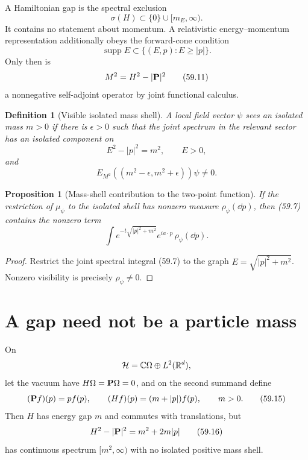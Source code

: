 \documentclass[11pt]{article}
\newtheorem{proposition}[theorem]{Proposition}
\newtheorem{definition}[theorem]{Definition}
\theoremstyle{remark}
\begin{document}
A Hamiltonian gap is the spectral exclusion
\[
 \sigma(H)\subset\{0\}\cup[m_E,\infty).                 \tag{59.9}
\]
It contains no statement about momentum.  A relativistic
energy--momentum representation additionally obeys the forward-cone
condition
\[
 \operatorname{supp}E\subset
 \{(E,p):E\geq|p|\}.                                    \tag{59.10}
\]
Only then is
\[
 M^2=H^2-|{\bf P}|^2                                   \tag{59.11}
\]
a nonnegative self-adjoint operator by joint functional calculus.

\begin{definition}[Visible isolated mass shell]
\label{def:v15v59-shell}
A local field vector \(\psi\) sees an isolated mass \(m>0\) if
there is \(\epsilon>0\) such that the joint spectrum in the relevant
sector has an isolated component on
\[
 E^2-|p|^2=m^2,\qquad E>0,                              \tag{59.12}
\]
and
\[
 E_{M^2}((m^2-\epsilon,m^2+\epsilon))\psi\neq0.          \tag{59.13}
\]
\end{definition}

\begin{proposition}[Mass-shell contribution to the two-point
function]
\label{prop:v15v59-shell}
If the restriction of \(\mu_\psi\) to the isolated shell has
nonzero measure \(\rho_\psi(\dd p)\), then (59.7) contains the
nonzero term
\[
 \int e^{-t\sqrt{|p|^2+m^2}}e^{ia\cdot p}\,
       \rho_\psi(\dd p).                                 \tag{59.14}
\]
\end{proposition}

\begin{proof}
Restrict the joint spectral integral (59.7) to the graph
\(E=\sqrt{|p|^2+m^2}\).  Nonzero visibility is precisely
\(\rho_\psi\neq0\).
\end{proof}

\section{A gap need not be a particle mass}

\begin{countertheorem}
\label{cth:v15v59-gap-not-mass}
On
\[
 {\cal H}=\mathbb C\Omega\oplus L^2(\mathbb R^d),
\]
let the vacuum have \(H\Omega={\bf P}\Omega=0\), and on the second
summand define
\[
 ({\bf P}f)(p)=p f(p),\qquad
 (Hf)(p)=(m+|p|)f(p),\qquad m>0.                        \tag{59.15}
\]
Then \(H\) has energy gap \(m\) and commutes with translations, but
\[
 H^2-|{\bf P}|^2=m^2+2m|p|                              \tag{59.16}
\]
has continuous spectrum \([m^2,\infty)\) with no isolated positive
mass shell.
\end{countertheorem}
\end{document}
